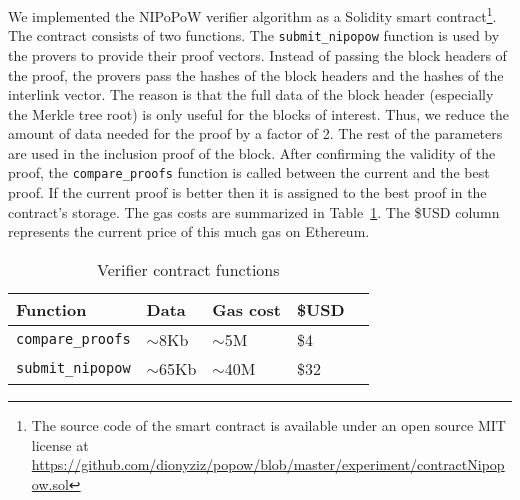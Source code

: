 We implemented the NIPoPoW verifier algorithm as
a Solidity smart contract\footnote{
The source code of the smart contract is available under an open source MIT
license at
\url{https://github.com/dionyziz/popow/blob/master/experiment/contractNipopow.sol}
}.
The contract consists of two functions.
The \texttt{sub\-mit\_ni\-po\-pow} function is used by the provers to provide their
proof vectors. Instead of passing the block headers of the proof, the provers
pass the hashes of the block headers and the hashes of the interlink vector. The
reason is that the full data of the block header (especially the Merkle tree
root) is only useful for the blocks of interest. Thus, we reduce the amount of
data needed for the proof by a factor of 2. The rest of the parameters are used
in the inclusion proof of the block. After confirming the validity of the proof,
the \texttt{compare\_proofs} function is called between the current and the best
proof. If the current proof is better then it is assigned to the best proof in
the contract's storage.
The gas costs are summarized in
Table~\ref{tbl:gascosts}. The \$USD column represents the current price of this
much gas on Ethereum.

\begin{table}[ht]
  \centering
  \caption{Verifier contract functions}
  \label{tbl:gascosts}
  \begin{tabular}{l|l|l|ll}
    \hline
    Function & Data & Gas cost & \$USD \\ \hline
    \texttt{compare\_proofs} & $\sim$8Kb & $\sim$5M & \$4 \\ \hline
    \texttt{submit\_nipopow} & $\sim$65Kb & $\sim$40M & \$32 \\ \hline
  \end{tabular}
\end{table}
